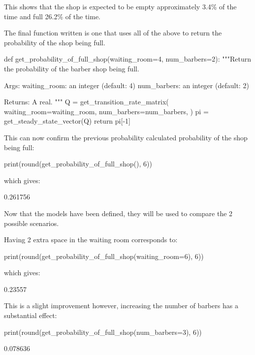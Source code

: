 This shows that the shop is expected to be empty approximately 3.4\% of the time
and full 26.2\% of the time.

The final function written is one that uses all of
the above to return the probability of the shop being full.

\begin{pyin}
def get_probability_of_full_shop(waiting_room=4, num_barbers=2):
    """Return the probability of the barber shop being full.

    Args:
        waiting_room: an integer (default: 4)
        num_barbers: an integer (default: 2)

    Returns:
        A real.
    """
    Q = get_transition_rate_matrix(
        waiting_room=waiting_room,
        num_barbers=num_barbers,
    )
    pi = get_steady_state_vector(Q)
    return pi[-1]
\end{pyin}

This can now confirm the previous probability calculated probability of the shop
being full:

\begin{pyin}
print(round(get_probability_of_full_shop(), 6))
\end{pyin}

which gives:

\begin{pyout}
0.261756
\end{pyout}

Now that the models have been defined, they will be used to compare the 2
possible scenarios.

Having 2 extra space in the waiting room corresponds to:

\begin{pyin}
print(round(get_probability_of_full_shop(waiting_room=6), 6))
\end{pyin}

which gives:

\begin{pyout}
0.23557
\end{pyout}

This is a slight improvement however, increasing the number of barbers has a
substantial effect:

\begin{pyin}
print(round(get_probability_of_full_shop(num_barbers=3), 6))
\end{pyin}

\begin{pyout}
0.078636
\end{pyout}

